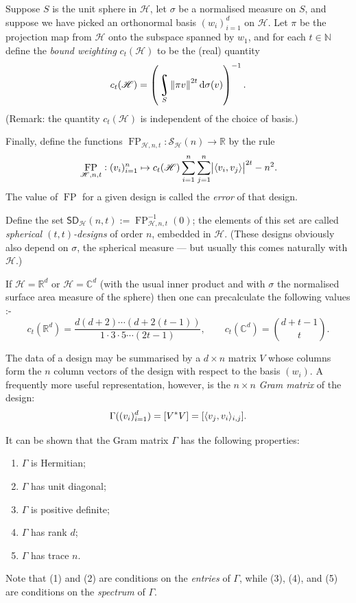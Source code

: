 \documentclass{article}
\newcommand{\C}{\mathbb{C}}
\newcommand{\R}{\mathbb{R}}
\newcommand{\N}{\mathbb{N}}
\newcommand{\scrS}{\mathscr{S}}
\newcommand{\scrH}{\mathscr{H}}
\newcommand{\SD}{\mathsf{SD}}
\DeclareMathOperator{\FP}{FP}
\DeclarePairedDelimiter{\inp}{\langle}{\rangle}
\DeclareMathOperator*{\rint}{\scalerel*{\rotatebox{17}{$\!\int\!$}}{\int}}
\newcommand{\df}{\textit}
\theoremstyle{definition}
\begin{document}
  Suppose $ S $ is the unit sphere in $ \scrH $, let $ \sigma $ be a normalised measure
  on $ S $, and suppose we have picked an orthonormal basis $ (w_i)_{i = 1}^d $ on $ \scrH $.
  Let $ \pi $ be the projection map from $ \scrH $ onto the subspace spanned by $ w_1 $,
  and for each $ t \in \N $ define the \df{bound weighting} $ c_t(\scrH) $ to be the (real) quantity
  \begin{displaymath}
    c_t(\scrH) = \left(\rint_S \norm{\pi v}^{2t} \dif{\sigma(v)}\right)^{-1}.
  \end{displaymath}
  (Remark: the quantity $ c_t(\scrH) $ is independent of the choice of basis.)

  Finally, define the functions $ \FP_{\scrH,n,t} : \scrS_\scrH(n) \to \R $ by the rule
  \begin{equation}\label{eqn:fp}
    \FP_{\scrH,n,t} : (v_i)_{i = 1}^n \mapsto
          c_t(\scrH) \sum_{i = 1}^n \sum_{j = 1}^n \abs{\inp{v_i, v_j}}^{2t}
            - n^2.
  \end{equation}
  The value of $ \FP $ for a given design is called the \textit{error} of that design.

  Define the set $ \SD_\scrH(n,t) := \FP_{\scrH,n,t}^{-1}(0) $; the elements of this set
  are called \df{spherical $ (t,t)$-designs} of order $ n $, embedded in $ \scrH $. (These
  designs obviously also depend on $ \sigma $, the spherical measure --- but usually this
  comes naturally with $ \scrH $.)

  If $ \scrH = \R^d $ or $ \scrH = \C^d $ (with the usual inner product and with $ \sigma $
  the normalised surface area measure of the sphere) then one can precalculate the following
  values \autocite[122]{waldron2018}:-
  \begin{displaymath}
    c_t(\R^d) = \frac{d(d+2)\cdots(d+ 2(t-1))}{1\cdot3\cdot5\cdots(2t-1)},
    \qquad
    c_t(\C^d) = \binom{d+t-1}{t}.
  \end{displaymath}

  The data of a design may be summarised by a $ d \times n $ matrix $ V $ whose columns form
  the $ n $ column vectors of the design with respect to the basis $ (w_i) $. A frequently
  more useful representation, however, is the $ n \times n $ \df{Gram matrix} of the design:
  \begin{displaymath}
    \Gamma((v_i)_{i=1}^d) = [V^* V] = [\inp{v_j,v_i}_{i,j}].
  \end{displaymath}

  It can be shown that the Gram matrix $ \Gamma $ has the following properties:
  \begin{enumerate}[label=(G\arabic*)]\label{pg:gram_properties}
    \item $ \Gamma $ is Hermitian;
    \item $ \Gamma $ has unit diagonal;
    \item $ \Gamma $ is positive definite;
    \item $ \Gamma $ has rank $ d $;
    \item $ \Gamma $ has trace $ n $.
  \end{enumerate}
  Note that (1) and (2) are conditions on the \emph{entries} of $ \Gamma $, while (3), (4), and (5) are conditions
  on the \emph{spectrum} of $ \Gamma $.
\end{document}
